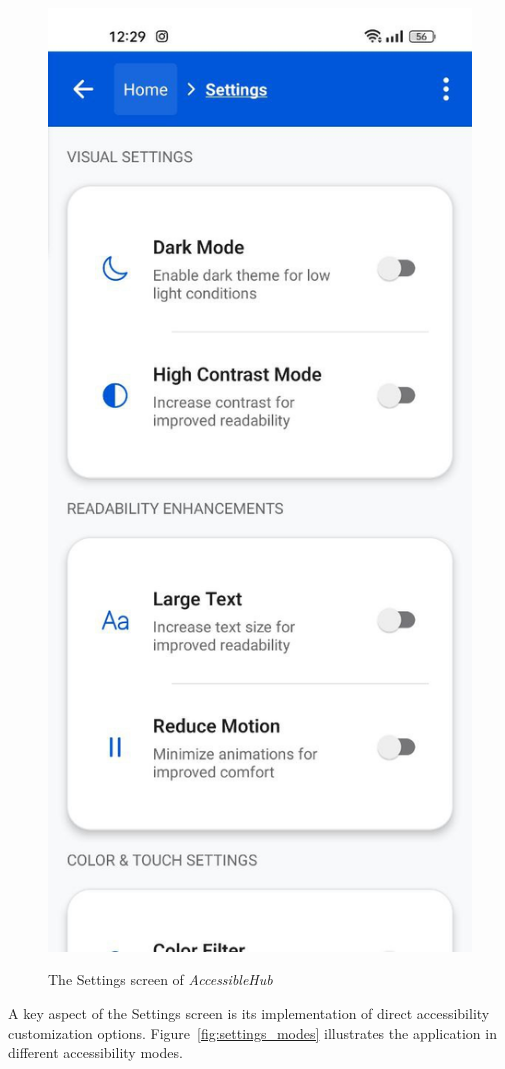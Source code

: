 \begin{enumerate}
\begin{figure}[ht]
\centering
\includegraphics[width=0.4\linewidth, alt={Screenshot of the Settings screen of AccessibleHub}]{img/settings.jpg}
\caption{The Settings screen of \textit{AccessibleHub}}\label{fig:settings}
\end{figure}

\pagebreak

A key aspect of the Settings screen is its implementation of direct accessibility customization options. Figure~\ref{fig:settings_modes} illustrates the application in different accessibility modes.


\end{enumerate}
